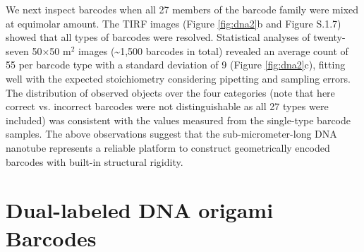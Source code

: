 We next inspect barcodes when all 27 members of the barcode family were mixed at equimolar amount. The TIRF images 
(Figure \ref{fig:dna2}b and Figure S.1.7) showed that all types of barcodes were resolved. Statistical 
analyses of twenty-seven 50×50 \textmu m$^2$ images (\textasciitilde1,500 barcodes in total) revealed an 
average count of 55 per barcode type with a standard deviation of 9 (Figure \ref{fig:dna2}c), fitting 
well with the expected stoichiometry considering pipetting and sampling errors. The 
distribution of observed objects over the four categories (note that here correct vs. 
incorrect barcodes were not distinguishable as all 27 types were included) was consistent 
with the values measured from the single-type barcode samples. The above observations 
suggest that the sub-micrometer-long DNA nanotube represents a reliable platform to 
construct geometrically encoded barcodes with built-in structural rigidity. 


\section{Dual-labeled DNA origami Barcodes}


